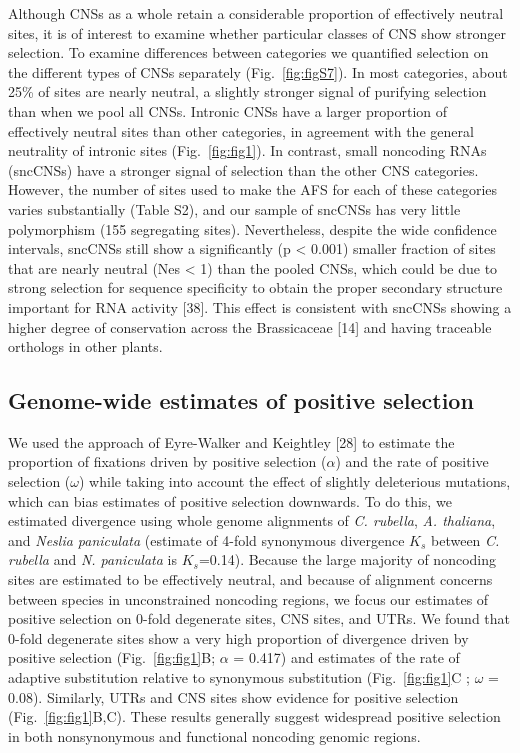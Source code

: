 Although CNSs as a whole retain a considerable proportion of effectively neutral sites, it is of interest to examine whether particular classes of CNS show stronger selection. To examine differences between categories we quantified selection on the different types of CNSs separately (Fig.~\ref{fig:figS7}). In most categories, about 25\% of sites are nearly neutral, a slightly stronger signal of purifying selection than when we pool all CNSs. Intronic CNSs have a larger proportion of effectively neutral sites than other categories, in agreement with the general neutrality of intronic sites (Fig.~\ref{fig:fig1}). In contrast, small noncoding RNAs (sncCNSs) have a stronger signal of selection than the other CNS categories. However, the number of sites used to make the AFS for each of these categories varies substantially (Table S2), and our sample of sncCNSs has very little polymorphism (155 segregating sites). Nevertheless, despite the wide confidence intervals, sncCNSs still show a significantly (p < 0.001) smaller fraction of sites that are nearly neutral (Nes < 1) than the pooled CNSs, which could be due to strong selection for sequence specificity to obtain the proper secondary structure important for RNA activity [38]. This effect is consistent with sncCNSs showing a higher degree of conservation across the Brassicaceae [14] and having traceable orthologs in other plants.


\subsection{Genome-wide estimates of positive selection} 
We used the approach of Eyre-Walker and Keightley [28] to estimate the proportion of fixations driven by positive selection ($\alpha$) and the rate of positive selection ($\omega$) while taking into account the effect of slightly deleterious mutations, which can bias estimates of positive selection downwards. To do this, we estimated divergence using whole genome alignments of \textit{C. rubella}, \textit{A. thaliana}, and \textit{Neslia paniculata} (estimate of 4-fold synonymous divergence $K_{s}$ between \textit{C. rubella} and \textit{N. paniculata} is $K_{s}$=0.14). Because the large majority of noncoding sites are estimated to be effectively neutral, and because of alignment concerns between species in unconstrained noncoding regions, we focus our estimates of positive selection on 0-fold degenerate sites, CNS sites, and UTRs. We found that 0-fold degenerate sites show a very high proportion of divergence driven by positive selection  (Fig.~\ref{fig:fig1}B; $\alpha$ = 0.417) and estimates of the rate of adaptive substitution relative to synonymous substitution (Fig.~\ref{fig:fig1}C ; $\omega$ = 0.08). Similarly, UTRs and CNS sites show evidence for positive selection (Fig.~\ref{fig:fig1}B,C). These results generally suggest widespread positive selection in both nonsynonymous and functional noncoding genomic regions.

